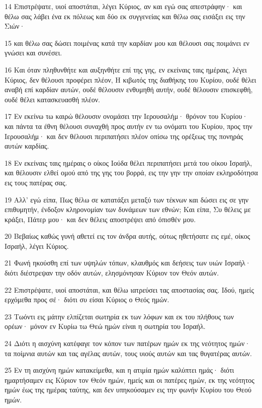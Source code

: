 \par 14 Επιστρέψατε, υιοί αποστάται, λέγει Κύριος, αν και εγώ σας απεστράφην· και θέλω σας λάβει ένα εκ πόλεως και δύο εκ συγγενείας και θέλω σας εισάξει εις την Σιών·
\par 15 και θέλω σας δώσει ποιμένας κατά την καρδίαν μου και θέλουσι σας ποιμάνει εν γνώσει και συνέσει.
\par 16 Και όταν πληθυνθήτε και αυξηνθήτε επί της γης, εν εκείναις ταις ημέραις, λέγει Κύριος, δεν θέλουσι προφέρει πλέον, Η κιβωτός της διαθήκης του Κυρίου, ουδέ θέλει αναβή επί καρδίαν αυτών, ουδέ θέλουσιν ενθυμηθή αυτήν, ουδέ θέλουσιν επισκεφθή, ουδέ θέλει κατασκευασθή πλέον.
\par 17 Εν εκείνω τω καιρώ θέλουσιν ονομάσει την Ιερουσαλήμ· θρόνον του Κυρίου· και πάντα τα έθνη θέλουσι συναχθή προς αυτήν εν τω ονόματι του Κυρίου, προς την Ιερουσαλήμ· και δεν θέλουσι περιπατήσει πλέον οπίσω της ορέξεως της πονηράς αυτών καρδίας.
\par 18 Εν εκείναις ταις ημέραις ο οίκος Ιούδα θέλει περιπατήσει μετά του οίκου Ισραήλ, και θέλουσιν ελθεί ομού από της γης του βορρά, εις την γην την οποίαν εκληροδότησα εις τους πατέρας σας.
\par 19 Αλλ' εγώ είπα, Πως θέλω σε κατατάξει μεταξύ των τέκνων και δώσει εις σε γην επιθυμητήν, ένδοξον κληρονομίαν των δυνάμεων των εθνών; Και είπα, Συ θέλεις με κράξει, Πάτερ μου· και δεν θέλεις αποστρέψει από όπισθέν μου.
\par 20 Βεβαίως καθώς γυνή αθετεί εις τον άνδρα αυτής, ούτως ηθετήσατε εις εμέ, οίκος Ισραήλ, λέγει Κύριος.
\par 21 Φωνή ηκούσθη επί των υψηλών τόπων, κλαυθμός και δεήσεις των υιών Ισραήλ· διότι διέστρεψαν την οδόν αυτών, ελησμόνησαν Κύριον τον Θεόν αυτών.
\par 22 Επιστρέψατε, υιοί αποστάται, και θέλω ιατρεύσει τας αποστασίας σας. Ιδού, ημείς ερχόμεθα προς σέ· διότι συ είσαι Κύριος ο Θεός ημών.
\par 23 Τωόντι εις μάτην ελπίζεται σωτηρία εκ των λόφων και εκ του πλήθους των ορέων· μόνον εν Κυρίω τω Θεώ ημών είναι η σωτηρία του Ισραήλ.
\par 24 Διότι η αισχύνη κατέφαγε τον κόπον των πατέρων ημών εκ της νεότητος ημών· τα ποίμνια αυτών και τας αγέλας αυτών, τους υιούς αυτών και τας θυγατέρας αυτών.
\par 25 Εν τη αισχύνη ημών κατακείμεθα, και η ατιμία ημών καλύπτει ημάς· διότι ημαρτήσαμεν εις Κύριον τον Θεόν ημών, ημείς και οι πατέρες ημών, εκ της νεότητος ημών έως της ημέρας ταύτης, και δεν υπηκούσαμεν εις την φωνήν Κυρίου του Θεού ημών.

